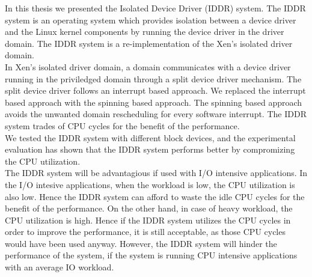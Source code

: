 In this thesis we presented the Isolated Device Driver (IDDR) system. The IDDR system is an operating system which provides isolation between a device driver and the Linux kernel components by running the device driver in the driver domain. The IDDR system is a re-implementation of the Xen's isolated driver domain.
\\[3mm]
In Xen's isolated driver domain, a domain communicates with a device driver running in the priviledged domain through a split device driver mechanism. The split device driver follows an interrupt based approach. We replaced the interrupt based approach with the spinning based approach. The spinning based approach avoids the unwanted domain rescheduling for every software interrupt. The IDDR system trades of CPU cycles for the benefit of the performance.
\\[3mm]
We tested the IDDR system with different block devices, and the experimental evaluation has shown that the IDDR system performs better by compromizing the CPU utilization. 
\\[3mm]
The IDDR system will be advantagious if used with I/O intensive applications. In the I/O intesive applications, when the workload is low, the CPU utilization is also low. Hence the IDDR system can afford to waste the idle CPU cycles for the benefit of the performance. On the other hand, in case of heavy workload, the CPU utilization is high. Hence if the IDDR system utilizes the CPU cycles in order to improve the performance, it is still acceptable, as those CPU cycles would have been used anyway. However, the IDDR system will hinder the performance of the system, if the system is running CPU intensive applications with an average IO workload.